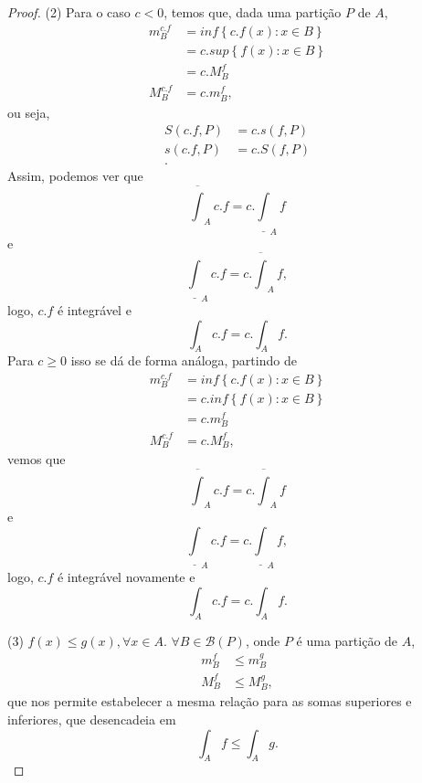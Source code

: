 \begin{proof}
    (2) Para o caso $c<0$, temos que, dada uma partição $P$ de $A$,
    \begin{align*}
	m_B^{c.f} &= inf\left\{ c.f(x): x\in B \right\} \\
		  &= c.sup\left\{ f(x): x\in B \right\} \\
		  &= c.M_B^{f} \\
	M_B^{c.f} &= c.m_B^{f}
    ,\end{align*}
    ou seja,
    \begin{align*}
	S\left( c.f, P \right) &= c.s\left( f,P \right) \\
	s\left( c.f, P \right) &= c.S\left( f,P \right) \\
    .\end{align*}
    Assim, podemos ver que \[
	\overline{\int}_A c.f = c.\underline{\int}_A f
    \] e \[
	\underline{\int}_A c.f = c.\overline{\int}_A f
    ,\] logo, $c.f$ é integrável e \[
    \int_A c.f = c.\int_A f
    .\] 
    Para $c\ge 0$ isso se dá de forma análoga, partindo de 
    \begin{align*}
	m_B^{c.f} &= inf\left\{ c.f(x): x\in B \right\} \\
		  &= c.inf\left\{ f(x): x\in B \right\} \\
		  &= c.m_B^{f} \\
	M_B^{c.f} &= c.M_B^{f}
    ,\end{align*}
    vemos que \[
	\overline{\int}_A c.f = c.\overline{\int}_A f
    \] e \[
	\underline{\int}_A c.f = c.\underline{\int}_A f
    ,\] logo, $c.f$ é integrável novamente e \[
    \int_A c.f = c.\int_A f
    .\] 

    (3) $f(x) \le g(x), \forall x\in A$. $\forall B\in \mathcal{B}\left( P \right) $, onde $P$ é uma partição de $A$,
    \begin{align*}
	m_B^{f}&\le m_B^{g} \\
	M_B^{f} &\le M_B^{g}
    ,\end{align*}
    que nos permite estabelecer a mesma relação para as somas superiores e inferiores, que desencadeia em  \[
    \int_A f\le \int_A g
    .\] 
\end{proof}



